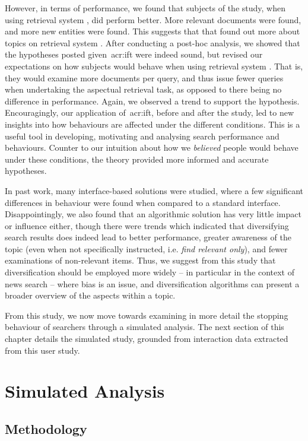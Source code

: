 However, in terms of performance, we found that subjects of the study, when using retrieval system , did perform better. More relevant documents were found, and more new entities were found. This suggests that that found out more about topics on retrieval system . After conducting a post-hoc analysis, we showed that the hypotheses posted given~\gls{acr:ift} were indeed sound, but revised our expectations on how subjects would behave when using retrieval system . That is, they would examine more documents per query, and thus issue fewer queries when undertaking the aspectual retrieval task, as opposed to there being no difference in performance. Again, we observed a trend to support the hypothesis. Encouragingly, our application of~\gls{acr:ift}, before and after the study, led to new insights into how behaviours are affected under the different conditions. This is a useful tool in developing, motivating and analysing search performance and behaviours. Counter to our intuition about how we \emph{believed} people would behave under these conditions, the theory provided more informed and accurate hypotheses.

In past work, many interface-based solutions were studied, where a few significant differences in behaviour were found when compared to a standard interface. Disappointingly, we also found that an algorithmic solution has very little impact or influence either, though there were trends which indicated that diversifying search results does indeed lead to better performance, greater awareness of the topic (even when not specifically instructed, i.e. \emph{find relevant only}), and fewer examinations of non-relevant items. Thus, we suggest from this study that diversification should be employed more widely -- in particular in the context of news search -- where bias is an issue, and diversification algorithms can present a broader overview of the aspects within a topic.

From this study, we now move towards examining in more detail the stopping behaviour of searchers through a simulated analysis. The next section of this chapter details the simulated study, grounded from interaction data extracted from this user study.

\section{Simulated Analysis}\label{sec:diversity:simulated}

\subsection{Methodology}\label{sec:diversity:simulated:method}

